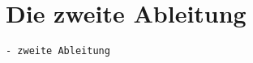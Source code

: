 %
%
%
\section{Die zweite Ableitung
\label{buch:variation2:section:zweiteableitung}}

\begin{verbatim}
- zweite Ableitung
\end{verbatim}
